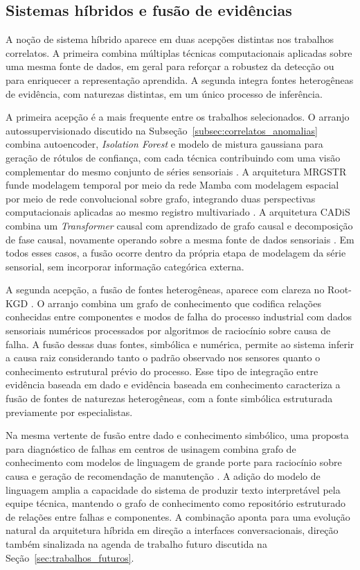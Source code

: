 \subsection{Sistemas híbridos e fusão de evidências}
\label{subsec:correlatos_hibridos}

A noção de sistema híbrido aparece em duas acepções distintas nos trabalhos correlatos. A primeira combina múltiplas técnicas computacionais aplicadas sobre uma mesma fonte de dados, em geral para reforçar a robustez da detecção ou para enriquecer a representação aprendida. A segunda integra fontes heterogêneas de evidência, com naturezas distintas, em um único processo de inferência.

A primeira acepção é a mais frequente entre os trabalhos selecionados. O arranjo autossupervisionado discutido na Subseção~\ref{subsec:correlatos_anomalias} combina autoencoder, \emph{Isolation Forest} e modelo de mistura gaussiana para geração de rótulos de confiança, com cada técnica contribuindo com uma visão complementar do mesmo conjunto de séries sensoriais \cite{islam2026explainable}. A arquitetura MRGSTR funde modelagem temporal por meio da rede Mamba com modelagem espacial por meio de rede convolucional sobre grafo, integrando duas perspectivas computacionais aplicadas ao mesmo registro multivariado \cite{wang2025spatiotemporal}. A arquitetura CADiS combina um \emph{Transformer} causal com aprendizado de grafo causal e decomposição de fase causal, novamente operando sobre a mesma fonte de dados sensoriais \cite{zeng2026cadis}. Em todos esses casos, a fusão ocorre dentro da própria etapa de modelagem da série sensorial, sem incorporar informação categórica externa.

A segunda acepção, a fusão de fontes heterogêneas, aparece com clareza no Root-KGD \cite{chen2026rootkgd}. O arranjo combina um grafo de conhecimento que codifica relações conhecidas entre componentes e modos de falha do processo industrial com dados sensoriais numéricos processados por algoritmos de raciocínio sobre causa de falha. A fusão dessas duas fontes, simbólica e numérica, permite ao sistema inferir a causa raiz considerando tanto o padrão observado nos sensores quanto o conhecimento estrutural prévio do processo. Esse tipo de integração entre evidência baseada em dado e evidência baseada em conhecimento caracteriza a fusão de fontes de naturezas heterogêneas, com a fonte simbólica estruturada previamente por especialistas.

Na mesma vertente de fusão entre dado e conhecimento simbólico, uma proposta para diagnóstico de falhas em centros de usinagem combina grafo de conhecimento com modelos de linguagem de grande porte para raciocínio sobre causa e geração de recomendação de manutenção \cite{nie2026knowledge}. A adição do modelo de linguagem amplia a capacidade do sistema de produzir texto interpretável pela equipe técnica, mantendo o grafo de conhecimento como repositório estruturado de relações entre falhas e componentes. A combinação aponta para uma evolução natural da arquitetura híbrida em direção a interfaces conversacionais, direção também sinalizada na agenda de trabalho futuro discutida na Seção~\ref{sec:trabalhos_futuros}.


